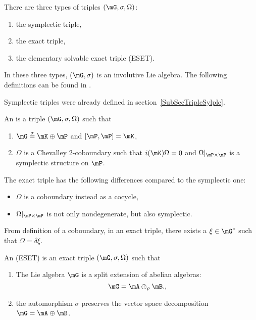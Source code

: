 There are three types of triples $(\mG,\sigma,\Omega)$:
\begin{enumerate}

	\item
		the symplectic triple,
	\item
		the exact triple, 
	\item
		the elementary solvable exact triple (ESET). 
\end{enumerate}
In these three types, $(\mG,\sigma)$ is an involutive Lie algebra. The following definitions can be found in \cite{StrictSolvableSym}.

Symplectic triples were already defined in section~\ref{SubSecTripleSylple}.
\begin{definition}
An  is a triple $(\mG,\sigma,\Omega)$ such that
\begin{enumerate}
\item $\mG\stackrel{\sigma}{=}\mK\oplus\mP$ and $[\mP,\mP]=\mK$,
\item $\Omega$ is a Chevalley $2$-coboundary such that $i(\mK)\Omega=0$ and $\Omega|_{\mP\times\mP}$ is a symplectic structure on $\mP$.
\end{enumerate}
\end{definition}
The exact triple has the following differences compared to the symplectic one:
\begin{itemize}
\item $\Omega$ is a coboundary instead as a cocycle,
\item $\Omega|_{\mP\times\mP}$ is not only nondegenerate, but also symplectic.
\end{itemize}
From definition of a coboundary, in an exact triple, there exists a $\xi\in\mG^*$ such that $\Omega=\delta\xi$.

\begin{definition}
An  (ESET) is an exact triple $(\mG,\sigma,\Omega)$ such that
\begin{enumerate}
\item The Lie algebra $\mG$ is a split extension of abelian algebras:
\begin{equation}   \label{EqSplitmGABab}
  \mG=\mA\oplus_{\rho}\mB.,
\end{equation}
\item the automorphism $\sigma$ preserves the vector space decomposition $\mG=\mA\oplus\mB$.
\end{enumerate}

\end{definition}

